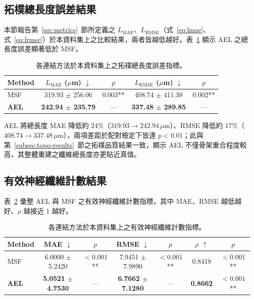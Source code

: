 \subsection{拓樸總長度誤差結果}
\label{subsec:length-results}

本節報告第~\ref{sec:metrics}~節所定義之 $L_{\text{MAE}}$、$L_{\text{RMSE}}$（式~\eqref{eq:lmae}、式~\eqref{eq:lrmse}）於本資料集上之比較結果，兩者皆越低越好。表~\ref{tab:length-results} 顯示 AEL 之總長度誤差顯著低於 MSF。

\begin{table}[htbp]
  \centering
  \caption{各連結方法於本資料集上之拓樸總長度誤差指標。}
  \label{tab:length-results}
  \small
  \setlength{\tabcolsep}{4pt}
  \begin{tabular}{lcccc}
    \toprule
    Method & $L_{\text{MAE}}$ ($\mu$m) $\downarrow$ & $p$ & $L_{\text{RMSE}}$ ($\mu$m) $\downarrow$ & $p$ \\
    \midrule
    MSF       & 319.93 $\pm$ 256.06 & 0.003** & 408.74 $\pm$ 411.38 & 0.002** \\
    \textbf{AEL} & \textbf{242.94 $\pm$ 235.79} & --- & \textbf{337.48 $\pm$ 289.85} & --- \\
    \bottomrule
  \end{tabular}
\end{table}

AEL 將總長度 MAE 降低約 $24\%$（$319.93 \to 242.94\,\mu\text{m}$）、RMSE 降低約 $17\%$（$408.74 \to 337.48\,\mu\text{m}$），兩項差距於配對檢定下皆達 $p < 0.01$；此與第~\ref{subsec:topo-results}~節之拓樸品質結果一致，顯示 AEL 不僅骨架重合程度較高，其整體重建之纖維總長度亦更貼近真值。

\subsection{有效神經纖維計數結果}
\label{subsec:counting-results}

表~\ref{tab:main-results} 彙整 AEL 與 MSF 之有效神經纖維計數指標，其中 MAE、RMSE 越低越好、$\rho$ 越接近 $1$ 越好。

\begin{table}[htbp]
  \centering
  \caption{各連結方法於本資料集上之有效神經纖維計數指標。}
  \label{tab:main-results}
  \small
  \setlength{\tabcolsep}{4pt}
  \begin{tabular}{lcccccc}
    \toprule
    Method & MAE $\downarrow$ & $p$ & RMSE $\downarrow$ & $p$ & $\rho$ $\uparrow$ & $p$ \\
    \midrule
    MSF       & 6.0000 $\pm$ 5.2420 & $<\!0.001$** & 7.9451 $\pm$ 7.9890 & $<\!0.001$** & 0.8418          & $<\!0.001$** \\
    \textbf{AEL} & \textbf{5.0521 $\pm$ 4.7530} & --- & \textbf{6.7662 $\pm$ 7.1280} & --- & \textbf{0.8662} & $<\!0.001$** \\
    \bottomrule
  \end{tabular}
\end{table}

